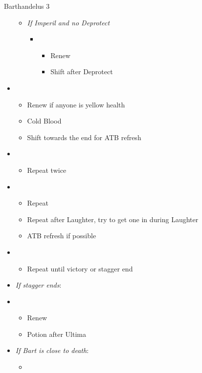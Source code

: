 \begin{battle}{Barthandelus 3}
\begin{multicols}{2}
\begin{itemize}
\begin{itemize}
        \item \textit{If Imperil and no Deprotect}
        \begin{itemize}
            \item \fifth
            \begin{itemize}
                \item Renew
                \item Shift after Deprotect
            \end{itemize}
        \end{itemize}
    \end{itemize}
    \item \sixth
    \begin{itemize}
        \item Renew if anyone is yellow health
        \item Cold Blood
        \item Shift towards the end for ATB refresh
    \end{itemize}
    \item \second
    \begin{itemize}
        \item Repeat twice
    \end{itemize}
    \item \first
    \begin{itemize}
        \item Repeat
        \item Repeat after Laughter, try to get one in during Laughter
        \item ATB refresh if possible
    \end{itemize}
    \item \second
    \begin{itemize}
        \item Repeat until victory or stagger end
    \end{itemize}
    \columnbreak
    \item \textit{If stagger ends}:
    \item \third
    \begin{itemize}
        \item Renew
        \item Potion after Ultima
    \end{itemize}
    \item \textit{If Bart is close to death}:
    \begin{itemize}
        \item \first
        \begin{itemize}

\end{itemize}
\end{itemize}
\end{itemize}
\end{multicols}
\end{battle}
